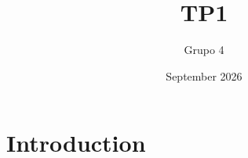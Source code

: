 \documentclass{article}
\title{TP1}
\author{Grupo 4}
\date{September 2026}
\begin{document}
\maketitle

\section{Introduction}
\end{document}
